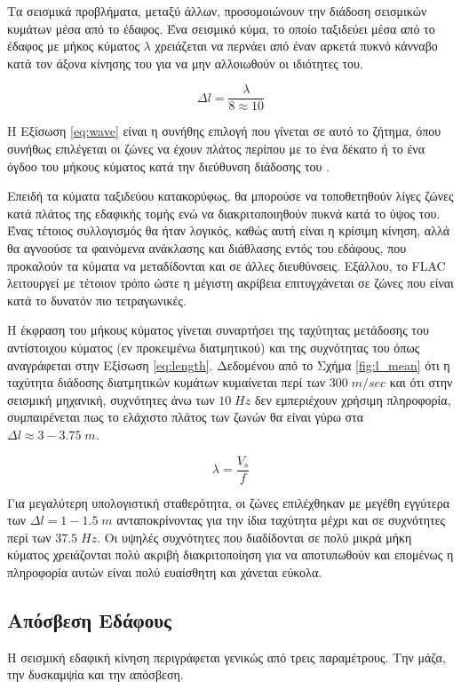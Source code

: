 Τα σεισμικά προβλήματα, μεταξύ άλλων, προσομοιώνουν την διάδοση σεισμικών κυμάτων μέσα από το έδαφος. Ένα σεισμικό κύμα, το οποίο ταξιδεύει μέσα από το έδαφος με μήκος κύματος $\lambda$ χρειάζεται να περνάει από έναν αρκετά πυκνό κάνναβο κατά τον άξονα κίνησης του για να μην αλλοιωθούν οι ιδιότητες του. 

\begin{equation}
	\Delta l = \frac{\lambda}{8\approx10}
	\label{eq:wave}
\end{equation}

Η Εξίσωση \ref{eq:wave} είναι η συνήθης επιλογή που γίνεται σε αυτό το ζήτημα, όπου συνήθως επιλέγεται οι ζώνες να έχουν πλάτος περίπου με το ένα δέκατο ή το ένα όγδοο του μήκους κύματος κατά την διεύθυνση διάδοσης του \parencite{Kuhlmeyer}.

Επειδή τα κύματα ταξιδεύου κατακορύφως, θα μπορούσε να τοποθετηθούν λίγες ζώνες κατά πλάτος της εδαφικής τομής ενώ να διακριτοποιηθούν πυκνά κατά το ύψος του. Ένας τέτοιος συλλογισμός θα ήταν λογικός, καθώς αυτή είναι η κρίσιμη κίνηση, αλλά θα αγνοούσε τα φαινόμενα ανάκλασης και διάθλασης εντός του εδάφους, που προκαλούν τα κύματα να μεταδίδονται και σε άλλες διευθύνσεις. Εξάλλου, το FLAC λειτουργεί με τέτοιον τρόπο ώστε η μέγιστη ακρίβεια επιτυγχάνεται σε ζώνες που είναι κατά το δυνατόν πιο τετραγωνικές.

Η έκφραση του μήκους κύματος γίνεται συναρτήσει της ταχύτητας μετάδοσης του αντίστοιχου κύματος (εν προκειμένω διατμητικού) και της συχνότητας του όπως αναγράφεται στην Εξίσωση \ref{eq:length}. Δεδομένου από το Σχήμα \ref{fig:l_mean} ότι η ταχύτητα διάδοσης διατμητικών κυμάτων κυμαίνεται περί των $300\;m/sec$ και ότι στην σεισμική μηχανική, συχνότητες άνω των $10\;Hz$ δεν εμπεριέχουν χρήσιμη πληροφορία, συμπαιρένεται πως το ελάχιστο πλάτος των ζωνών θα είναι γύρω στα $\Delta l \approx 3-3.75\;m$.

\begin{equation}
	\lambda = \frac{V_s}{f}
	\label{eq:length}
\end{equation}

 Για μεγαλύτερη υπολογιστική σταθερότητα, οι ζώνες επιλέχθηκαν με μεγέθη εγγύτερα των $\Delta l = 1-1.5\;m$ ανταποκρίνοντας για την ίδια ταχύτητα μέχρι και σε συχνότητες περί των $37.5\;Hz$. Οι υψηλές συχνότητες που διαδίδονται σε πολύ μικρά μήκη κύματος χρειάζονται πολύ ακριβή διακριτοποίηση για να αποτυπωθούν και επομένως η πληροφορία αυτών είναι πολύ ευαίσθητη και χάνεται εύκολα.

\subsection{Απόσβεση Εδάφους}
\label{sbs:damping}
Η σεισμική εδαφική κίνηση περιγράφεται γενικώς από τρεις παραμέτρους. Την μάζα, την δυσκαμψία και την απόσβεση.

